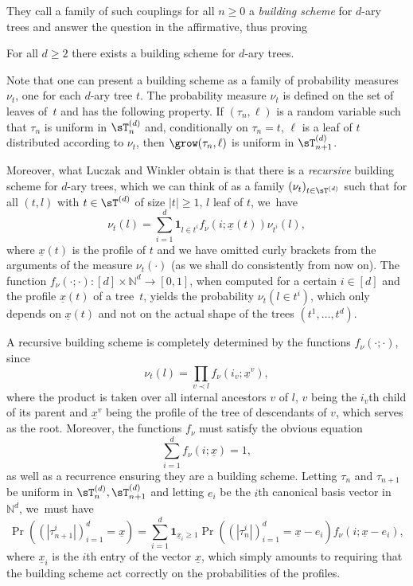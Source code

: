 They call a family of such couplings for all $n\geq 0$ a \emph{building scheme} for $d$-ary trees and answer the question in the affirmative, thus proving

\begin{thm}\label{thm:building scheme existence}For all $d\geq 2$ there exists a building scheme for $d$-ary trees.
\end{thm}

Note that one can present a building scheme as a family of probability measures~$\nu_t$, one for each $d$-ary tree $t$. The probability measure $\nu_t$ is defined on the set of leaves of~$t$ and has the following property. If $(\tau_n,\ell)$ is a random variable such that $\tau_n$ is uniform in $\sT_n^{(d)}$ and, conditionally on $\tau_n=t$, $\ell$ is a leaf of $t$ distributed according to $\nu_t$, then $\grow(\tau_n, \ell)$ is uniform in $\sT^{(d)}_{n+1}$.

Moreover, what Luczak and Winkler obtain is that there is a \emph{recursive} building scheme for $d$-ary trees, which we can think of as a family $(\nu_t)_{t\in \sT^{(d)}}$ such that for all $(t,l)$ with $t\in \sT^{(d)}$ of size $|t|\geq 1$, $l$ leaf of $t$, we~have
\[
\nu_t(l)=\sum_{i=1}^d \mathbf{1}_{l\in t^i}f_\nu(i;\underline{x}(t))\nu_{t^i}(l),
\]
where $\underline{x}(t)$ is the profile of $t$ and we have omitted curly brackets from the arguments of the measure $\nu_t(\cdot)$ (as we shall do consistently from now on). The function $f_\nu(\cdot ;\cdot):[d]\times \mathbb{N}^d\to [0,1]$, when computed for a certain $i\in[d]$ and the profile $\underline{x}(t)$ of a tree~$t$, yields the probability $\nu_t(l\in t^i)$, which only depends on $\underline{x}(t)$ and not on the actual shape of the trees $(t^1,\ldots,t^d)$.

A recursive building scheme is completely determined by the functions $f_\nu(\cdot ; \cdot)$, since
\[
\nu_t(l)=\prod_{v\prec l}f_\nu(i_v;\underline{x}^v),
\]
where the product is taken over all internal ancestors $v$ of $l$, $v$ being the $i_v$th child of its parent and $\underline{x}^v$ being the profile of the tree of descendants of $v$, which serves as the root. Moreover, the functions $f_\nu$ must satisfy the obvious equation
\[
\sum_{i=1}^df_\nu(i;\underline{x})=1,
\]
as well as a recurrence ensuring they are a building scheme. Letting $\tau_n$ and $\tau_{n+1}$ be uniform in $\sT_n^{(d)}, \sT_{n+1}^{(d)}$ and letting $e_i$ be the $i$th canonical basis vector in $\mathbb{N}^d$, we~must have
\begin{equation}\label{eq:d-ary recursion}\Pr((|\tau_{n+1}^i|)_{i=1}^d=\underline{x})=\sum_{i=1}^d\mathbf{1}_{\underline{x}_i\geq 1}\Pr((|\tau_{n}^i|)_{i=1}^d=\underline{x}-e_i)f_\nu(i;\underline{x}-e_i),\end{equation}
where $\underline{x}_i$ is the $i$th entry of the vector $\underline{x}$, which simply amounts to requiring that the building scheme act correctly on the probabilities of the profiles.


